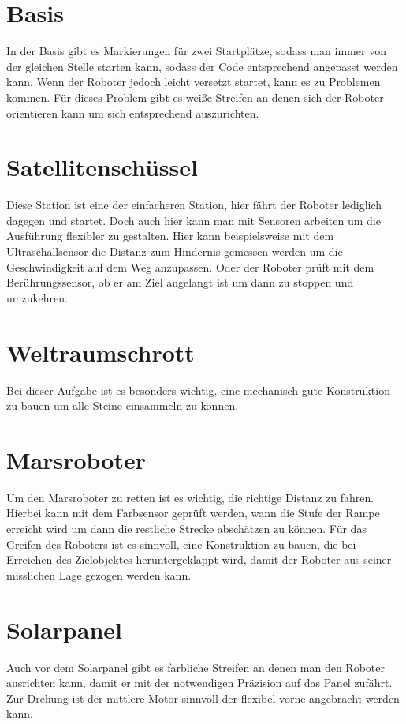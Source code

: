 \documentclass[
	ngerman,
	accentcolor=1c,%
	marginpar=false,
	identbarcolor=1c,
	]{tudapub}
\begin{document}
\section{Basis}
In der Basis gibt es Markierungen f\"ur zwei Startpl\"atze, sodass man immer von der gleichen Stelle starten kann, sodass der Code entsprechend angepasst werden kann.\newline
Wenn der Roboter jedoch leicht versetzt startet, kann es zu Problemen kommen. F\"ur dieses Problem gibt es wei\ss{}e Streifen an denen sich der Roboter orientieren kann um sich entsprechend auszurichten.

\section{Satellitensch\"ussel}
Diese Station ist eine der einfacheren Station, hier f\"ahrt der Roboter lediglich dagegen und startet. Doch auch hier kann man mit Sensoren arbeiten um die Ausf\"uhrung flexibler zu gestalten. Hier kann beispielsweise mit dem Ultraschallsensor die Distanz zum Hindernis gemessen werden um die Geschwindigkeit auf dem Weg anzupassen. Oder der Roboter pr\"uft mit dem Ber\"uhrungssensor, ob er am Ziel angelangt ist um dann zu stoppen und umzukehren.

\section{Weltraumschrott}
Bei dieser Aufgabe ist es besonders wichtig, eine mechanisch gute Konstruktion zu bauen um alle Steine einsammeln zu k\"onnen.

\section{Marsroboter}
Um den Marsroboter zu retten ist es wichtig, die richtige Distanz zu fahren. Hierbei kann mit dem Farbsensor gepr\"uft werden, wann die Stufe der Rampe erreicht wird um dann die restliche Strecke absch\"atzen zu k\"onnen. F\"ur das Greifen des Roboters ist es sinnvoll, eine Konstruktion zu bauen, die bei Erreichen des Zielobjektes heruntergeklappt wird, damit der Roboter aus seiner misslichen Lage gezogen werden kann.

\section{Solarpanel}
Auch vor dem Solarpanel gibt es farbliche Streifen an denen man den Roboter ausrichten kann, damit er mit der notwendigen Pr\"azision auf das Panel zuf\"ahrt. Zur Drehung ist der mittlere Motor sinnvoll der flexibel vorne angebracht werden kann.
\end{document}
